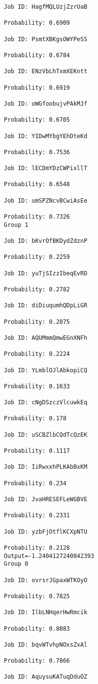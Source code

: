 \documentclass[11pt]{article}
\begin{document}
\begin{Verbatim}[commandchars=\\\{\}]
Job ID: HagfMQLUzjZzrUaB

Probability: 0.6909

Job ID: PsmtXBKgsOWYPeSS

Probability: 0.6784

Job ID: ENzVbLhTxmXEKntt

Probability: 0.6919

Job ID: oWGfoobujvPAkMJf

Probability: 0.6705

Job ID: YIDwMYbgYEhDteKd

Probability: 0.7536

Job ID: lECDmYDzCWPixllT

Probability: 0.6548

Job ID: umSPZNcvBCwiAsEe

Probability: 0.7326
Group 1

Job ID: bKvrOfBKDydZdznP

Probability: 0.2259

Job ID: yuTjSIzzIbeqEvRD

Probability: 0.2782

Job ID: diDiuqumhQDpLiGR

Probability: 0.2075

Job ID: AQUMmmQmwEGnXNFh

Probability: 0.2224

Job ID: YLmblOJlAbkopiCQ

Probability: 0.1633

Job ID: cNgDSzczVlcuwkEq

Probability: 0.178

Job ID: uSCBZlbCQdTcQzEK

Probability: 0.1117

Job ID: IiRwxxhPLKAbBxKM

Probability: 0.234

Job ID: JvaHRESEFLeWGBVE

Probability: 0.2331

Job ID: yzbFjOtflKCXpNTU

Probability: 0.2128
Output=-1.2404127240842393
Group 0

Job ID: ovrsrJGpaxWTKOyO

Probability: 0.7825

Job ID: IlbLNHqerHwRmcik

Probability: 0.8083

Job ID: bqvWTvhpNOxsZxAl

Probability: 0.7866

Job ID: AquysuKATuqDduOZ


\end{Verbatim}
\end{document}
